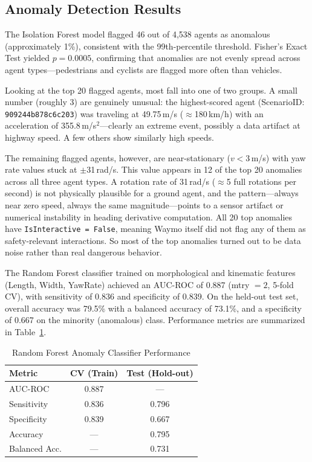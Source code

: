 \documentclass[conference]{IEEEtran}
\begin{document}
\subsection{Anomaly Detection Results}

The Isolation Forest model flagged 46 out of 4{,}538 agents as anomalous (approximately 1\%), consistent with the 99th-percentile threshold. Fisher's Exact Test yielded $p = 0.0005$, confirming that anomalies are not evenly spread across agent types---pedestrians and cyclists are flagged more often than vehicles.

Looking at the top 20 flagged agents, most fall into one of two groups. A small number (roughly 3) are genuinely unusual: the highest-scored agent (ScenarioID: \texttt{909244b878c6c203}) was traveling at 49.75\,m/s ($\approx$180\,km/h) with an acceleration of 355.8\,m/s$^2$---clearly an extreme event, possibly a data artifact at highway speed. A few others show similarly high speeds.

The remaining flagged agents, however, are near-stationary ($v < 3$\,m/s) with yaw rate values stuck at $\pm$31\,rad/s. This value appears in 12 of the top 20 anomalies across all three agent types. A rotation rate of 31\,rad/s ($\approx$5 full rotations per second) is not physically plausible for a ground agent, and the pattern---always near zero speed, always the same magnitude---points to a sensor artifact or numerical instability in heading derivative computation. All 20 top anomalies have \texttt{IsInteractive = False}, meaning Waymo itself did not flag any of them as safety-relevant interactions. So most of the top anomalies turned out to be data noise rather than real dangerous behavior.

The Random Forest classifier trained on morphological and kinematic features (Length, Width, YawRate) achieved an AUC-ROC of 0.887 (mtry $= 2$, 5-fold CV), with sensitivity of 0.836 and specificity of 0.839. On the held-out test set, overall accuracy was 79.5\% with a balanced accuracy of 73.1\%, and a specificity of 0.667 on the minority (anomalous) class. Performance metrics are summarized in Table~\ref{tab:rf}.

\begin{table}[h]
\centering
\caption{Random Forest Anomaly Classifier Performance}
\label{tab:rf}
\begin{tabular}{lcc}
\toprule
Metric & CV (Train) & Test (Hold-out) \\
\midrule
AUC-ROC     & 0.887 & ---   \\
Sensitivity & 0.836 & 0.796 \\
Specificity & 0.839 & 0.667 \\
Accuracy    & ---   & 0.795 \\
Balanced Acc.& ---  & 0.731 \\
\bottomrule
\end{tabular}
\end{table}
\end{document}
